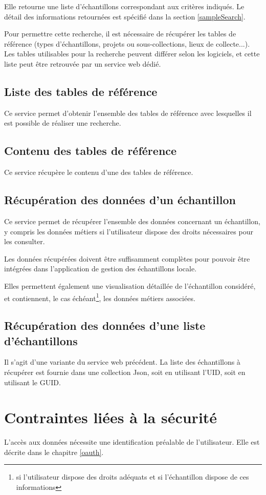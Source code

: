 Elle retourne une liste d'échantillons correspondant aux critères indiqués. Le détail des informations retournées est spécifié dans la section \ref{sampleSearch}.

Pour permettre cette recherche, il est nécessaire de récupérer les tables de référence (types d'échantillons, projets ou sous-collections, lieux de collecte...). Les tables utilisables pour la recherche peuvent différer selon les logiciels, et cette liste peut être retrouvée par un service web dédié.

\subsection{Liste des tables de référence}
Ce service permet d'obtenir l'ensemble des tables de référence avec lesquelles il est possible de réaliser une recherche.

\subsection{Contenu des tables de référence}
Ce service récupère le contenu d'une des tables de référence.

\subsection{Récupération des données d'un échantillon}
Ce service permet de récupérer l'ensemble des données concernant un échan\-tillon, y compris les données \og métiers \fg{} si l'utilisateur dispose des droits néces\-saires pour les consulter.

Les données récupérées doivent être suffisamment complètes pour pouvoir être intégrées dans l'application de gestion des échantillons locale.

Elles permettent également une visualisation détaillée de l'échantillon consi\-déré, et contiennent, le cas échéant\footnote{si l'utilisateur dispose des droits adéquats et si l'échantillon dispose de ces informations}, les données \og métiers \fg{} associées.

\subsection{Récupération des données d'une liste d'échantillons}

Il s'agit d'une variante du service web précédent. La liste des échantillons à récupérer est fournie dans une collection Json, soit en utilisant l'UID, soit en utilisant le GUID.

\section{Contraintes liées à la sécurité}

L'accès aux données nécessite une identification préalable de l'utilisateur. Elle est décrite dans le chapitre \ref{oauth}.


